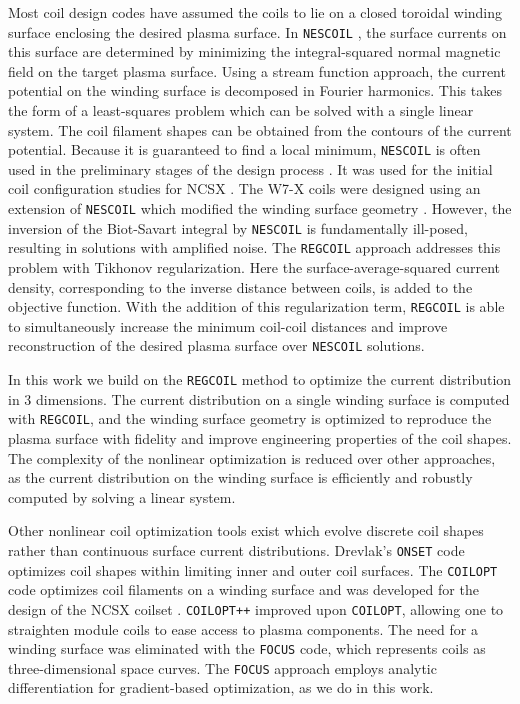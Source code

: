 \documentclass[aps,unsortedaddress]{revtex4-1}
\begin{document}
Most coil design codes have assumed the coils to lie on a closed toroidal winding surface enclosing the desired plasma surface. In \texttt{NESCOIL} \cite{Merkel1987}, the surface currents on this surface are determined by minimizing the integral-squared normal magnetic field on the target plasma surface. Using a stream function approach, the current potential on the winding surface is decomposed in Fourier harmonics. This takes the form of a least-squares problem which can be solved with a single linear system. The coil filament shapes can be obtained from the contours of the current potential. Because it is guaranteed to find a local minimum, \texttt{NESCOIL} is often used in the preliminary stages of the design process \cite{Spong2010, Ku2011, Drevlak2013}. It was used for the initial coil configuration studies for NCSX \cite{Pomphrey2001}. The W7-X coils were designed using an extension of \texttt{NESCOIL} which modified the winding surface geometry \cite{Beidler1990}. However, the inversion of the Biot-Savart integral by \texttt{NESCOIL} is fundamentally ill-posed, resulting in solutions with amplified noise. The \texttt{REGCOIL} \cite{Landreman2017} approach addresses this problem with Tikhonov regularization. Here the surface-average-squared current density, corresponding to the inverse distance between coils, is added to the objective function. With the addition of this regularization term, \texttt{REGCOIL} is able to simultaneously increase the minimum coil-coil distances and improve reconstruction of the desired plasma surface over \texttt{NESCOIL} solutions. 

In this work we build on the \texttt{REGCOIL} method to optimize the current distribution in 3 dimensions. The current distribution on a single winding surface is computed with \texttt{REGCOIL}, and the winding surface geometry is optimized to reproduce the plasma surface with fidelity and improve engineering properties of the coil shapes. The complexity of the nonlinear optimization is reduced over other approaches, as the current distribution on the winding surface is efficiently and robustly computed by solving a linear system.  

Other nonlinear coil optimization tools exist which evolve discrete coil shapes rather than continuous surface current distributions. Drevlak's \texttt{ONSET} code \cite{Drevlak1998} optimizes coil shapes within limiting inner and outer coil surfaces. The \texttt{COILOPT} \cite{Strickler2002,Strickler2004} code optimizes coil filaments on a winding surface and was developed for the design of the NCSX coilset \cite{Zarnstorff2001}. \texttt{COILOPT++} \cite{Brown2015} improved upon \texttt{COILOPT}, allowing one to straighten module coils to ease access to plasma components. The need for a winding surface was eliminated with the \texttt{FOCUS} \cite{Zhu2017} code, which represents coils as three-dimensional space curves. The \texttt{FOCUS} approach employs analytic differentiation for gradient-based optimization, as we do in this work. 
\end{document}
